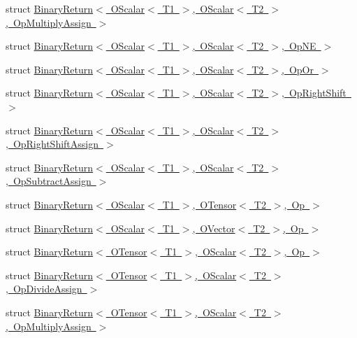 \begin{DoxyCompactItemize}
\item 
struct \mbox{\hyperlink{structENSEM_1_1BinaryReturn_3_01OScalar_3_01T1_01_4_00_01OScalar_3_01T2_01_4_00_01OpMultiplyAssign_01_4}{Binary\+Return$<$ O\+Scalar$<$ T1 $>$, O\+Scalar$<$ T2 $>$, Op\+Multiply\+Assign $>$}}
\item 
struct \mbox{\hyperlink{structENSEM_1_1BinaryReturn_3_01OScalar_3_01T1_01_4_00_01OScalar_3_01T2_01_4_00_01OpNE_01_4}{Binary\+Return$<$ O\+Scalar$<$ T1 $>$, O\+Scalar$<$ T2 $>$, Op\+N\+E $>$}}
\item 
struct \mbox{\hyperlink{structENSEM_1_1BinaryReturn_3_01OScalar_3_01T1_01_4_00_01OScalar_3_01T2_01_4_00_01OpOr_01_4}{Binary\+Return$<$ O\+Scalar$<$ T1 $>$, O\+Scalar$<$ T2 $>$, Op\+Or $>$}}
\item 
struct \mbox{\hyperlink{structENSEM_1_1BinaryReturn_3_01OScalar_3_01T1_01_4_00_01OScalar_3_01T2_01_4_00_01OpRightShift_01_4}{Binary\+Return$<$ O\+Scalar$<$ T1 $>$, O\+Scalar$<$ T2 $>$, Op\+Right\+Shift $>$}}
\item 
struct \mbox{\hyperlink{structENSEM_1_1BinaryReturn_3_01OScalar_3_01T1_01_4_00_01OScalar_3_01T2_01_4_00_01OpRightShiftAssign_01_4}{Binary\+Return$<$ O\+Scalar$<$ T1 $>$, O\+Scalar$<$ T2 $>$, Op\+Right\+Shift\+Assign $>$}}
\item 
struct \mbox{\hyperlink{structENSEM_1_1BinaryReturn_3_01OScalar_3_01T1_01_4_00_01OScalar_3_01T2_01_4_00_01OpSubtractAssign_01_4}{Binary\+Return$<$ O\+Scalar$<$ T1 $>$, O\+Scalar$<$ T2 $>$, Op\+Subtract\+Assign $>$}}
\item 
struct \mbox{\hyperlink{structENSEM_1_1BinaryReturn_3_01OScalar_3_01T1_01_4_00_01OTensor_3_01T2_01_4_00_01Op_01_4}{Binary\+Return$<$ O\+Scalar$<$ T1 $>$, O\+Tensor$<$ T2 $>$, Op $>$}}
\item 
struct \mbox{\hyperlink{structENSEM_1_1BinaryReturn_3_01OScalar_3_01T1_01_4_00_01OVector_3_01T2_01_4_00_01Op_01_4}{Binary\+Return$<$ O\+Scalar$<$ T1 $>$, O\+Vector$<$ T2 $>$, Op $>$}}
\item 
struct \mbox{\hyperlink{structENSEM_1_1BinaryReturn_3_01OTensor_3_01T1_01_4_00_01OScalar_3_01T2_01_4_00_01Op_01_4}{Binary\+Return$<$ O\+Tensor$<$ T1 $>$, O\+Scalar$<$ T2 $>$, Op $>$}}
\item 
struct \mbox{\hyperlink{structENSEM_1_1BinaryReturn_3_01OTensor_3_01T1_01_4_00_01OScalar_3_01T2_01_4_00_01OpDivideAssign_01_4}{Binary\+Return$<$ O\+Tensor$<$ T1 $>$, O\+Scalar$<$ T2 $>$, Op\+Divide\+Assign $>$}}
\item 
struct \mbox{\hyperlink{structENSEM_1_1BinaryReturn_3_01OTensor_3_01T1_01_4_00_01OScalar_3_01T2_01_4_00_01OpMultiplyAssign_01_4}{Binary\+Return$<$ O\+Tensor$<$ T1 $>$, O\+Scalar$<$ T2 $>$, Op\+Multiply\+Assign $>$}}

\end{DoxyCompactItemize}
